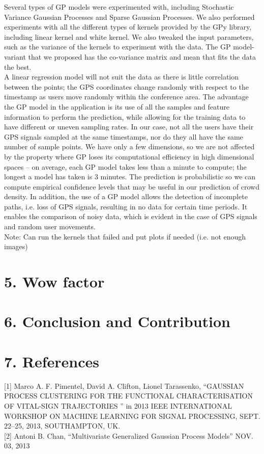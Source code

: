 \documentclass[letterpaper]{article}
\begin{document}
Several types of GP models were experimented with, including Stochastic Variance Gaussian Processes and Sparse Gaussian Processes. We also performed experiments with all the different types of kernels provided by the GPy library, including linear kernel and white kernel. We also tweaked the input parameters, such as the variance of the kernels to experiment with the data. The GP model-variant that we proposed has the co-variance matrix and mean that fits the data the best. \\ 

A linear regression model will not suit the data as there is little correlation between the points; the GPS coordinates change randomly with respect to the timestamp as users move randomly within the conference area. The advantage the GP model in the application is its use of all the samples and feature information to perform the prediction, while allowing for the training data to have different or uneven sampling rates. In our case, not all the users have their GPS signals sampled at the same timestamps, nor do they all have the same number of sample points. We have only a few dimensions, so we are not affected by the property where GP loses its computational efficiency in high dimensional spaces -- on average, each GP model takes less than a minute to compute; the longest a model has taken is 3 minutes. The prediction is probabilistic so we can compute empirical confidence levels that may be useful in our prediction of crowd density. In addition, the use of a GP model allows the detection of incomplete paths, i.e. loss of GPS signals, resulting in no data for certain time periods. It enables the comparison of noisy data, which is evident in the case of GPS signals and random user movements.
\\

Note: Can run the kernels that failed and put plots if needed (i.e. not enough images)

\section{5.  Wow factor}

\section{6.  Conclusion and Contribution}

\section{7.  References}

[1] Marco A. F. Pimentel, David A. Clifton, Lionel Tarassenko, “GAUSSIAN PROCESS CLUSTERING FOR THE FUNCTIONAL CHARACTERISATION OF VITAL-SIGN TRAJECTORIES
” in 2013 IEEE INTERNATIONAL WORKSHOP ON MACHINE LEARNING FOR SIGNAL PROCESSING, SEPT. 22–25, 2013, SOUTHAMPTON, UK. \\

[2] Antoni B. Chan, “Multivariate Generalized Gaussian Process Models” NOV. 03, 2013
\end{document}
